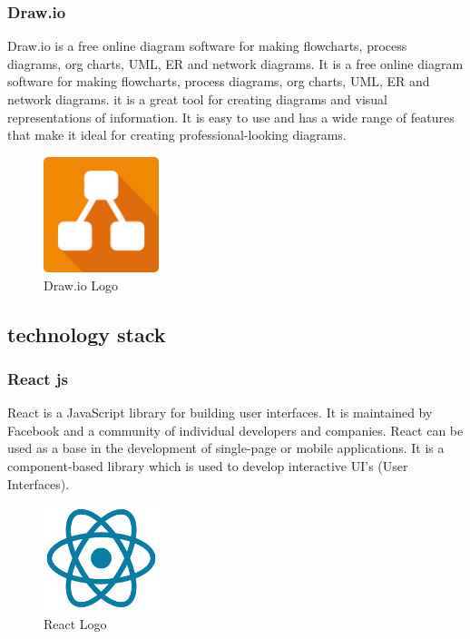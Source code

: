 \subsubsection{Draw.io}
Draw.io is a free online diagram software for making flowcharts, process
diagrams, org charts, UML, ER and network diagrams. It is a free online diagram
software for making flowcharts, process diagrams, org charts, UML, ER and
network diagrams.
it is a great tool for creating diagrams and visual representations of
information. It is easy to use and has a wide range of features that make it
ideal for creating professional-looking diagrams.

\begin{figure}[h!]
      \centering
      \includegraphics[width=0.3\textwidth]{../images/drawio.png}
      \caption{Draw.io Logo}
      \label{fig:drawio}
\end{figure}
\bigbreak

\newpage
\subsection{technology stack}
\subsubsection{React js}
React is a JavaScript library for building user interfaces. It is maintained by
Facebook and a community of individual developers and companies. React can be
used as a base in the development of single-page or mobile applications. It is
a component-based library which is used to develop interactive UI's (User
Interfaces).

\begin{figure}[h!]
      \centering
      \includegraphics[width=0.3\textwidth]{../images/reactjs.png}
      \caption{React Logo}
      \label{fig:react}
\end{figure}


